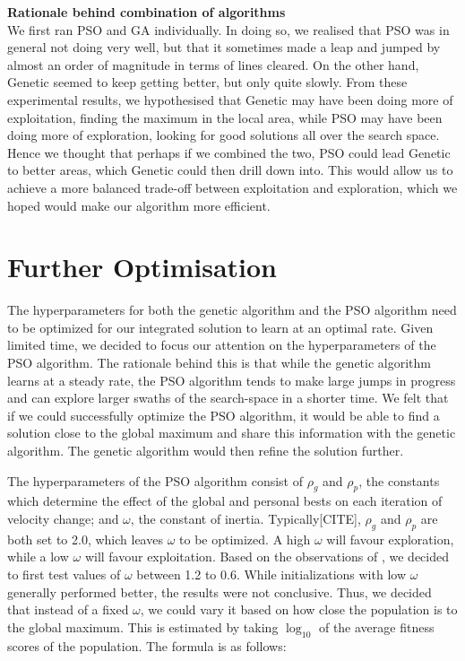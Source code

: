 \documentclass[12pt]{article}
\begin{document}
	\textbf{Rationale behind combination of algorithms}\\
	We first ran PSO and GA individually. In doing so, we realised that PSO was in general not doing
	very well, but that it sometimes made a leap and jumped by almost an order of magnitude
	in terms of lines cleared. On the other hand, Genetic seemed to keep getting
	better, but only quite slowly. From these experimental results, we hypothesised
	that Genetic may have been doing more of exploitation, finding the maximum in the local area,
	while PSO may have been doing more of exploration, looking for good solutions all over
	the search space. Hence we thought that perhaps if we combined the two,
	PSO could lead Genetic to better areas, which Genetic could then drill down into.
	This would allow us to achieve a more balanced trade-off between exploitation
	and exploration, which we hoped would make our algorithm more efficient.

	\section{Further Optimisation}
	The hyperparameters for both the genetic algorithm and the PSO algorithm need
	to be optimized for our integrated solution to learn at an optimal rate.
	Given limited time, we decided to focus our attention on the hyperparameters
	of the PSO algorithm. The rationale behind this is that while the genetic
	algorithm learns at a steady rate, the PSO algorithm tends to make large jumps
	in progress and can explore larger swaths of the search-space in a shorter
	time. We felt that if we could successfully optimize the PSO algorithm, it would be able to
	find a solution close to the global maximum and share this information with the genetic algorithm.
	The genetic algorithm would then refine the solution further.

	The hyperparameters of the PSO algorithm consist of $\rho_g$ and $\rho_p$, the constants
	which determine the effect of the global and personal bests on each iteration
	of velocity change; and $\omega$, the constant of inertia. Typically[CITE], $\rho_g$ and $\rho_p$ are both
	set to 2.0, which leaves $\omega$ to be optimized. A high $\omega$ will favour exploration,
	while a low $\omega$ will favour exploitation. Based on the observations of \cite{shi1998parameter}, we decided to first test values of $\omega$ between 1.2 to 0.6.
	While initializations with low $\omega$ generally performed better, the results were
	not conclusive. Thus, we decided that instead of a fixed $\omega$, we could vary it
	based on how close the population is to the global maximum. This is estimated
	by taking $\log_{10}$ of the average fitness scores of the population. The formula is as follows:
\end{document}
